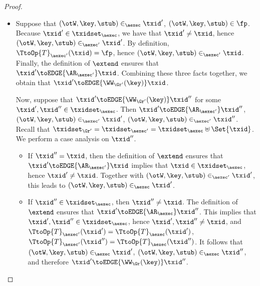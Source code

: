 \begin{proof}
\begin{enumerate}
\begin{itemize}
\item Suppose that $(\otW, \key, \stub) \in_{\aexec} \txid'$, $(\otW, \key, \stub) \in \fp$. Because $\txid' \in \txidset_{\aexec}$, 
we have that $\txid' \neq \txid$, hence $(\otW, \key, \stub) \in_{\aexec' }\txid'$. By definition, 
$\TtoOp{T}_{\aexec'}(\txid) = \fp$, hence $(\otW, \key, \stub) \in_{\aexec'} \txid$. Finally, 
the definition of $\extend$ ensures that $\txid' \toEDGE{\AR_{\aexec'}} \txid$. Combining 
these three facts together, we obtain that  
$\txid' \toEDGE{\WW_{\Gr'}(\key)} \txid$. 

Now, suppose that $\txid' \toEDGE{\WW_{\Gr'}(\key)} \txid''$ for some $\txid', \txid'' \in \txidset_{\aexec}$. 
Then $\txid' \toEDGE{\AR_{\aexec'}} \txid''$, $(\otW, \key, \stub) \in_{\aexec'} \txid'$, $(\otW, \key, \stub) 
\in_{\aexec'} \txid''$. 
Recall that $\txidset_{\Gr'} = \txidset_{\aexec'} = \txidset_{\aexec} \uplus \Set{ \txid }$. We perform a case analysis on $\txid''$. 

\begin{itemize}

\item If $\txid'' = \txid$, then the definition of $\extend$ ensures that $\txid' \toEDGE{\AR_{\aexec'}} \txid$ 
implies that $\txid \in \txidset_{\aexec}$, hence $\txid' \neq \txid$. 
Together with $(\otW, \key, \stub) \in_{\aexec'} 
\txid'$, this leads to $(\otW, \key, \stub) \in_{\aexec} \txid'$. 

\item If $\txid'' \in \txidset_{\aexec}$, then $\txid'' \neq \txid$. The definition of $\extend$ ensures that $\txid' \toEDGE{\AR_{\aexec}} \txid''$. 
This implies that $\txid', \txid'' \in \txidset_{\aexec}$, hence $\txid', \txid'' \neq \txid$, and $\TtoOp{T}_{\aexec'}(\txid') = \TtoOp{T}_{\aexec}(\txid')$, 
$\TtoOp{T}_{\aexec'}(\txid'') = \TtoOp{T}_{\aexec}(\txid'')$. It follows that $(\otW, \key, \stub) \in_{\aexec} \txid'$, 
$(\otW, \key, \stub) \in_{\aexec} \txid''$, and therefore $\txid' \toEDGE{\WW_{\Gr}(\key)} \txid''$.

\end{itemize}
\end{itemize}
\end{enumerate}
\end{proof}


